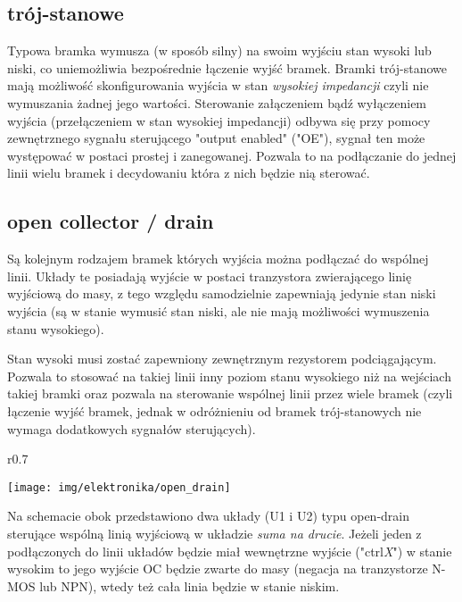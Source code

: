 \documentclass{pdfBooklets}
\begin{document}
\subsection{trój-stanowe}
Typowa bramka wymusza (w sposób silny) na swoim wyjściu stan wysoki lub niski, co uniemożliwia bezpośrednie łączenie wyjść bramek.
Bramki trój-stanowe mają możliwość skonfigurowania wyjścia w stan \emph{wysokiej impedancji} czyli nie wymuszania żadnej jego wartości.
Sterowanie załączeniem bądź wyłączeniem wyjścia (przełączeniem w stan wysokiej impedancji) odbywa się przy pomocy zewnętrznego sygnału sterującego "output enabled" ("OE"), sygnał ten może występować w postaci prostej i zanegowanej.
Pozwala to na podłączanie do jednej linii wielu bramek i decydowaniu która z nich będzie nią sterować.

\subsection{open collector / drain}
Są kolejnym rodzajem bramek których wyjścia można podłączać do wspólnej linii. Układy te posiadają wyjście w postaci tranzystora zwierającego linię wyjściową do masy, z tego względu samodzielnie zapewniają jedynie stan niski wyjścia (są w stanie wymusić stan niski, ale nie mają możliwości wymuszenia stanu wysokiego).

Stan wysoki musi zostać zapewniony zewnętrznym rezystorem podciągającym. Pozwala to stosować na takiej linii inny poziom stanu wysokiego niż na wejściach takiej bramki oraz pozwala na sterowanie wspólnej linii przez wiele bramek (czyli łączenie wyjść bramek, jednak w odróżnieniu od bramek trój-stanowych nie wymaga dodatkowych sygnałów sterujących).

\begin{wrapfigure}{r}{0.7\textwidth}
  \begin{center}
    \vspace{-20pt}
    \texttt{[image: img/elektronika/open\_drain]}
    \vspace{-20pt}
  \end{center}
\end{wrapfigure}
Na schemacie obok przedstawiono dwa układy (U1 i U2) typu open-drain sterujące wspólną linią wyjściową w układzie \emph{suma na drucie}. Jeżeli jeden z podłączonych do linii układów będzie miał wewnętrzne wyjście ("ctrl\textit{X}") w stanie wysokim to jego wyjście OC będzie zwarte do masy (negacja na tranzystorze N-MOS lub NPN), wtedy też cała linia będzie w stanie niskim.
\end{document}
